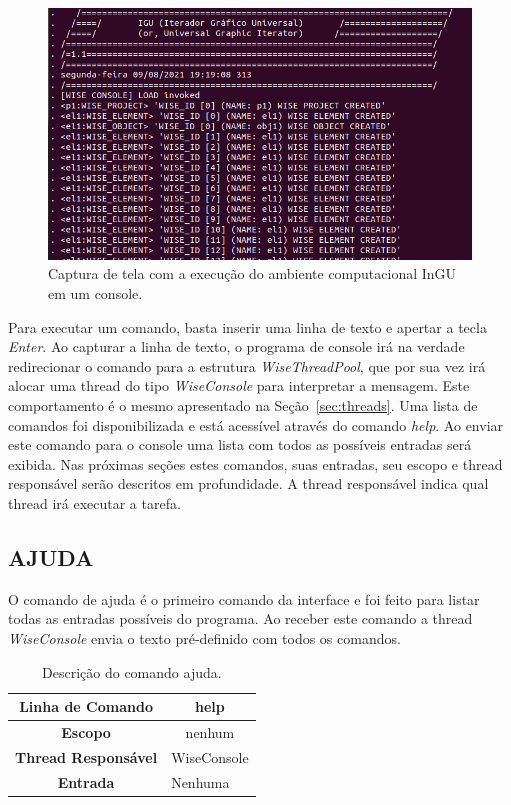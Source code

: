 \documentclass[a4paper,12pt]{monografia}
\theoremstyle{plain}
\theoremstyle{definition}
\theoremstyle{remark}
\begin{document}
\begin{figure}[!htbp]
	\centering
	\includegraphics[scale=0.45]{Figures/InGU_console.png}
	\caption{Captura de tela com a execução do ambiente computacional InGU em um console.}
	\label{fig11:ajuda}
\end{figure}

Para executar um comando, basta inserir uma linha de texto e apertar a tecla \textit{Enter}.  Ao capturar a linha de texto, o programa de console irá na verdade redirecionar o comando para a estrutura \textit{WiseThreadPool}, que por sua vez irá alocar uma thread do tipo \textit{WiseConsole} para interpretar a mensagem. Este comportamento é o mesmo apresentado na Seção~\ref{sec:threads}. Uma lista de comandos foi disponibilizada e está acessível através do comando \textit{help}. Ao enviar este comando para o console uma lista com todos as possíveis entradas será exibida. Nas próximas seções estes comandos, suas entradas, seu escopo e thread responsável serão descritos em profundidade. A thread responsável indica qual thread irá executar a tarefa. 

\subsection{AJUDA}\label{sec:help}

O comando de ajuda é o primeiro comando da interface e foi feito para listar todas as entradas possíveis do programa. Ao receber este comando a thread \textit{WiseConsole} envia o texto pré-definido com todos os comandos.

\begin{center}
	\begin{table}[!htbp]
		\begin{tabular}{|c|m{}|}
			\hline
			\textbf{Linha de Comando} & \multicolumn{1}{c|}{help} \\
			\hline
			\textbf{Escopo} & \multicolumn{1}{c|}{nenhum} \\
			\hline
			\textbf{Thread Responsável} & \multicolumn{1}{c|}{WiseConsole} \\
			\hline
			\textbf{Entrada} & Nenhuma \\
			\hline
		\end{tabular}
	\caption{Descrição do comando ajuda.}
	\label{tab:help}
	\end{table}
\end{center}
\end{document}
